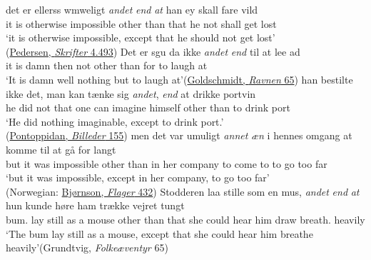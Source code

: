 \ea \label{ex:07-86}
\ea
\gll det er ellerss wmweligt \emph{andet} \emph{end} \emph{at} han ey skall fare vild\\
 it is otherwise impossible other than that he not shall get lost\\
\glt `it is otherwise impossible, except that he should not get lost'\\\hfill(\href{https://www.google.co.jp/books/edition/Christiern_Pedersens_Danske_skrifter_bd/rslJAQAAMAAJ?hl=en&gbpv=1&dq=%22han+ey+skall+fare+vild%22&pg=PA493&printsec=frontcover}{Pedersen, \textit{Skrifter} 4.493}) %
\ex 
\gll Det er sgu da ikke \emph{andet} \emph{end} til at lee ad\\
 it is damn then not other than for to laugh at\\
\glt `It is damn well nothing but to laugh at'\hfill(\href{https://archive.org/details/ravnenfortlling00goldgoog/page/64/mode/2up?q=%22Det+er+fgu+da+iffe+Andet%22&view=theater}{Goldschmidt, \textit{Ravnen} 65})
\ex
\gll han bestilte ikke det, man kan tænke sig \emph{andet}, \emph{end} at drikke portvin\\
 he did not that one can imagine himself other than to drink port\\
\glt `He did nothing imaginable, except to drink port.'\\\hfill(\href{https://www.henrikpontoppidan.dk/text/kilder/artik/fiktive/pca008_vinterbillede.html}{Pontoppidan, \textit{Billeder} 155})
\largerpage[2]
\ex
\gll men det var umuligt \emph{annet} \emph{æn} i hennes omgang at komme til at gå for langt\\
 but it was impossible other than in her company to come to to go too far\\
\glt `but it was impossible, except in her company, to go too far'\\\hfill(Norwegian: \href{http://f9.no/ebok/filer/bjornson_det_flager_i_byen_og_paa_havnen.html}{Bjørnson, \textit{Flager} 432}) %
\ex 
\gll Stodderen laa stille som en mus, \emph{andet} \emph{end} \emph{at} hun kunde høre ham trække vejret tungt\\
 bum.\DEF{} lay still as a mouse other than that she could hear him draw breath.\DEF{} heavily\\
\glt `The bum lay still as a mouse, except that she could hear him breathe heavily'\hfill(Grundtvig, \textit{Folkeæventyr} 65) %
\z
\z

